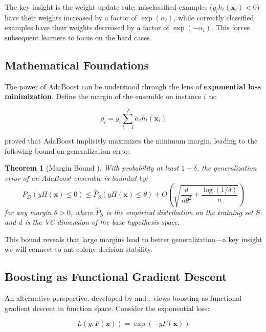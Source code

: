 \documentclass[12pt,letterpaper]{article}
\newtheorem{theorem}{Theorem}[section]
\begin{document}
The key insight is the weight update rule: misclassified examples ($y_i h_t(\mathbf{x}_i) < 0$) have their weights increased by a factor of $\exp(\alpha_t)$, while correctly classified examples have their weights decreased by a factor of $\exp(-\alpha_t)$. This forces subsequent learners to focus on the hard cases.

\subsection{Mathematical Foundations}

The power of AdaBoost can be understood through the lens of \textbf{exponential loss minimization}. Define the margin of the ensemble on instance $i$ as:

\begin{equation}
\rho_i = y_i \sum_{t=1}^T \alpha_t h_t(\mathbf{x}_i)
\end{equation}

\citet{schapire1998improved} proved that AdaBoost implicitly maximizes the minimum margin, leading to the following bound on generalization error:

\begin{theorem}[Margin Bound \citep{schapire1998improved}]
With probability at least $1-\delta$, the generalization error of an AdaBoost ensemble is bounded by:
\begin{equation}
P_{\mathcal{D}}(y H(\mathbf{x}) \leq 0) \leq \hat{P}_S(y H(\mathbf{x}) \leq \theta) + O\left(\sqrt{\frac{d}{n\theta^2} + \frac{\log(1/\delta)}{n}}\right)
\end{equation}
for any margin $\theta > 0$, where $\hat{P}_S$ is the empirical distribution on the training set $S$ and $d$ is the VC dimension of the base hypothesis space.
\end{theorem}

This bound reveals that large margins lead to better generalization—a key insight we will connect to ant colony decision stability.

\subsection{Boosting as Functional Gradient Descent}

An alternative perspective, developed by \citet{breiman1998arcing} and \citet{friedman2000additive}, views boosting as functional gradient descent in function space. Consider the exponential loss:

\begin{equation}
L(y, F(\mathbf{x})) = \exp(-y F(\mathbf{x}))
\end{equation}
\end{document}
